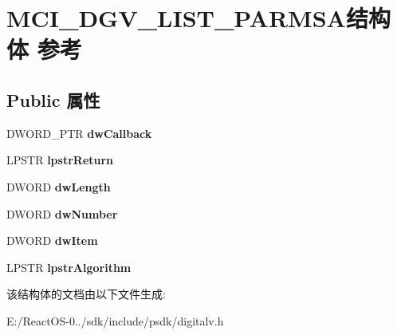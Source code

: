 \hypertarget{struct_m_c_i___d_g_v___l_i_s_t___p_a_r_m_s_a}{}\section{M\+C\+I\+\_\+\+D\+G\+V\+\_\+\+L\+I\+S\+T\+\_\+\+P\+A\+R\+M\+S\+A结构体 参考}
\label{struct_m_c_i___d_g_v___l_i_s_t___p_a_r_m_s_a}
\subsection*{Public 属性}
\begin{DoxyCompactItemize}
\item 
\mbox{\label{struct_m_c_i___d_g_v___l_i_s_t___p_a_r_m_s_a_a999d89260f616a1de343f4edabdf9442}} 
D\+W\+O\+R\+D\+\_\+\+P\+TR {\bfseries dw\+Callback}
\item 
\mbox{\label{struct_m_c_i___d_g_v___l_i_s_t___p_a_r_m_s_a_a6ab53a5ec5f26eb4ec668342bd2b2053}} 
L\+P\+S\+TR {\bfseries lpstr\+Return}
\item 
\mbox{\label{struct_m_c_i___d_g_v___l_i_s_t___p_a_r_m_s_a_a2e4b84c42d53bf53050bc09662a37c78}} 
D\+W\+O\+RD {\bfseries dw\+Length}
\item 
\mbox{\label{struct_m_c_i___d_g_v___l_i_s_t___p_a_r_m_s_a_a9427dca9b27e251e69dbe1973b511e22}} 
D\+W\+O\+RD {\bfseries dw\+Number}
\item 
\mbox{\label{struct_m_c_i___d_g_v___l_i_s_t___p_a_r_m_s_a_a716eb683bcd4a2fe7d2d56bb1ecffb99}} 
D\+W\+O\+RD {\bfseries dw\+Item}
\item 
\mbox{\label{struct_m_c_i___d_g_v___l_i_s_t___p_a_r_m_s_a_a4653785096e4c72434db32feb4045840}} 
L\+P\+S\+TR {\bfseries lpstr\+Algorithm}
\end{DoxyCompactItemize}


该结构体的文档由以下文件生成\+:\begin{DoxyCompactItemize}
\item 
E\+:/\+React\+O\+S-\/0../sdk/include/psdk/digitalv.\+h\end{DoxyCompactItemize}

